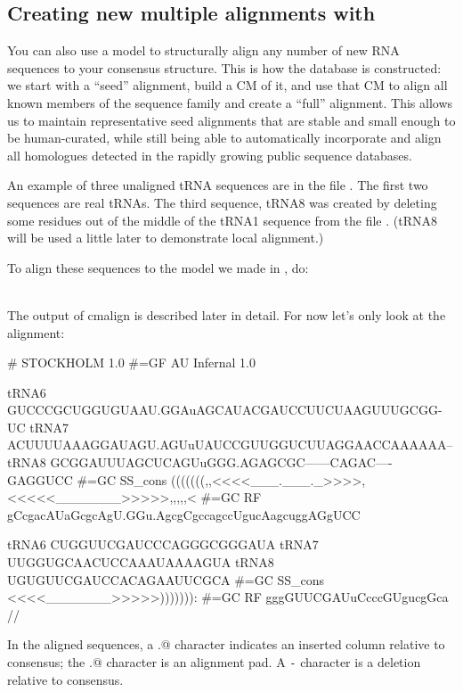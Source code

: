 \subsection{Creating new multiple alignments with }

You can also use a model to structurally align any number of new RNA
sequences to your consensus structure. This is how the 
database is constructed: we start with a ``seed'' alignment, build a CM
of it, and use that CM to align all known members of the sequence
family and create a ``full'' alignment. This allows us to maintain
representative seed alignments that are stable and small enough to be
human-curated, while still being able to automatically incorporate and
align all homologues detected in the rapidly growing public sequence
databases.

An example of three unaligned tRNA sequences are in the file
. The first two sequences are real tRNAs. The third
sequence, tRNA8 was created by deleting some residues out of the middle
of the tRNA1 sequence from the file . (tRNA8 will be used a little later to
demonstrate local alignment.)

To align these sequences to the model we made in , do:

\\

The output of cmalign is described later in detail. For now let's only
look at the alignment:

{\samepage
\begin{sreoutput}
# STOCKHOLM 1.0
#=GF AU Infernal 1.0

tRNA6        GUCCCGCUGGUGUAAU.GGAuAGCAUACGAUCCUUCUAAGUUUGCGG-UC
tRNA7        ACUUUUAAAGGAUAGU.AGUuUAUCCGUUGGUCUUAGGAACCAAAAAA--
tRNA8        GCGGAUUUAGCUCAGUuGGG.AGAGCGC------CAGAC----GAGGUCC
#=GC SS_cons (((((((,,<<<<___.___._>>>>,<<<<<_______>>>>>,,,,,<
#=GC RF      gCcgacAUaGcgcAgU.GGu.AgcgCgccagccUgucAagcuggAGgUCC

tRNA6        CUGGUUCGAUCCCAGGGCGGGAUA
tRNA7        UUGGUGCAACUCCAAAUAAAAGUA
tRNA8        UGUGUUCGAUCCACAGAAUUCGCA
#=GC SS_cons <<<<_______>>>>>))))))):
#=GC RF      gggGUUCGAUuCcccGUgucgGca
//
\end{sreoutput}
}

In the aligned sequences, a \verb@.@ character indicates an inserted
column relative to consensus; the \verb@.@ character is an alignment
pad. A \verb+-+ character is a deletion relative to consensus.

